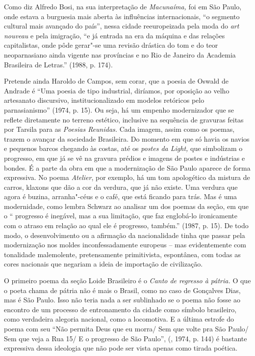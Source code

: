 Como diz Alfredo Bosi, na sua interpretação de \emph{Macunaíma,} foi em
São Paulo, onde estava a burguesia mais aberta às influências
internacionais, ``o segmento cultural mais avançado do país'', nessa
cidade reeuropeizada pela moda do \emph{art nouveau} e pela imigração,
``e já entrada na era da máquina e das relações capitalistas, onde pôde
gerar"-se uma revisão drástica do tom e do teor neoparnasiano ainda
vigente nas províncias e no Rio de Janeiro da Academia Brasileira de
Letras.'' (1988, p. 174).

Pretende ainda Haroldo de Campos, sem corar, que a poesia de Oswald de
Andrade é ``Uma poesia de tipo industrial, diríamos, por oposição ao
velho artesanato discursivo, institucionalizado em modelos retóricos
pelo parnasianismo'' (1974, p. 15). Ou seja, há um empenho modernizador
que se reflete diretamente no terreno estético, inclusive na sequência
de gravuras feitas por Tarsila para as \emph{Poesias Reunidas.} Cada
imagem, assim como os poemas, trazem o avançar da sociedade Brasileira.
Do momento em que só havia os navios e pequenos barcos chegando às
costas, até os \emph{postes da Light,} que simbolizam o progresso, em
que já se vê na gravura prédios e imagens de postes e indústrias e
bondes. É a parte da obra em que a modernização de São Paulo aparece de
forma expressiva. No poema \emph{Atelier}, por exemplo, há um tom
apologético da mistura de carros, klaxons que dão a cor da verdura, que
já não existe. Uma verdura que agora é buzina, arranha"-céus e o café,
que está ficando para trás. Mas é uma modernidade, como lembra Schwarz
ao analisar um dos poemas da seção, em que o `` progresso é inegável,
mas a sua limitação, que faz englobá-lo ironicamente com o atraso em
relação ao qual ele é progresso, também.'' (1987, p. 15). De todo modo,
o desenvolvimento ou a afirmação da nacionalidade tinha que passar pela
modernização nos moldes inconfessadamente europeus -- mas evidentemente
com tonalidade malemolente, pretensamente primitivista, espontânea, com
todas as cores nacionais que negariam a ideia de importação de
civilização.

O primeiro poema da seção Loide Brasileiro é o \emph{Canto de regresso à
pátria.} O que o poeta chama de pátria não é mais o Brasil, como no caso
de Gonçalves Dias, mas é São Paulo. Isso não teria nada a ser sublinhado
se o poema não fosse ao encontro de um processo de entronamento da
cidade como símbolo brasileiro, como verdadeira alegoria nacional, como
a locomotiva. E a última estrofe do poema com seu ``Não permita Deus que
eu morra/ Sem que volte pra São Paulo/ Sem que veja a Rua 15/ E o
progresso de São Paulo'', (, 1974, p. 144) é bastante expressiva
dessa ideologia que não pode ser vista apenas como tirada poética.

